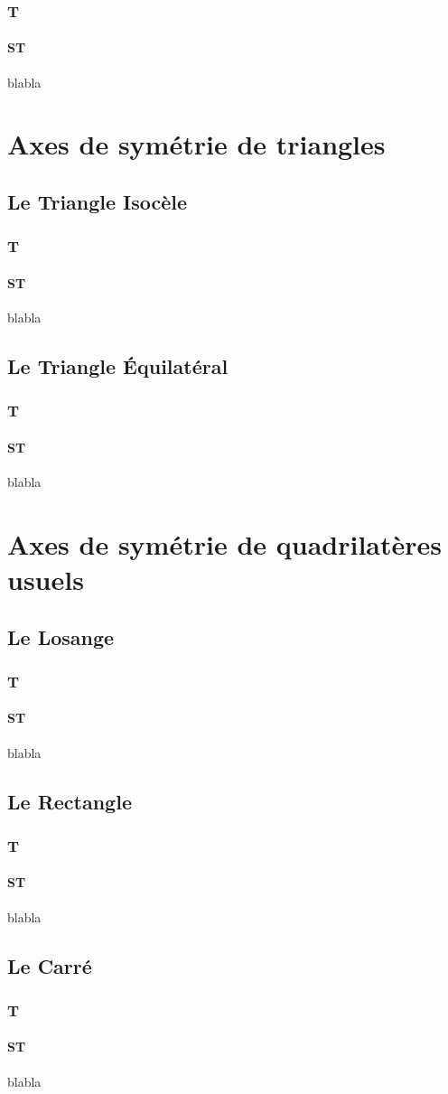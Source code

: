 \documentclass{beamer}
\begin{document}
\begin{frame}
\frametitle{T}  
\framesubtitle{ST}
blabla
\end{frame}

\section{Axes de symétrie de triangles}


\subsection{Le Triangle Isocèle}

\begin{frame}
\frametitle{T}  
\framesubtitle{ST}
blabla
\end{frame}

\subsection{Le Triangle Équilatéral}

\begin{frame}
\frametitle{T}  
\framesubtitle{ST}
blabla
\end{frame}

\section{Axes de symétrie de quadrilatères usuels}

\subsection{Le Losange}

\begin{frame}
\frametitle{T}  
\framesubtitle{ST}
blabla
\end{frame}

\subsection{Le Rectangle}

\begin{frame}
\frametitle{T}  
\framesubtitle{ST}
blabla
\end{frame}

\subsection{Le Carré}

\begin{frame}
\frametitle{T}  
\framesubtitle{ST}
blabla
\end{frame}
\end{document}
